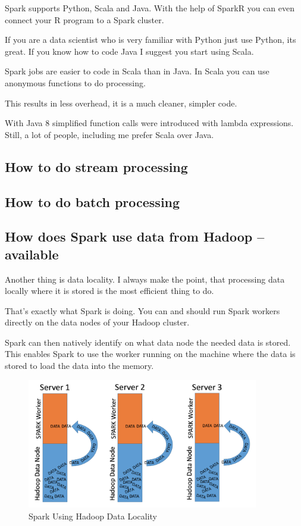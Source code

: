 \documentclass[12pt, numbers=noenddot]{scrreprt} %
\begin{document}
Spark supports Python, Scala and Java. With the help of SparkR you can even connect your R program to a Spark cluster.

If you are a data scientist who is very familiar with Python just use Python, its great. If you know how to code Java I suggest you start using Scala.

Spark jobs are easier to code in Scala than in Java. In Scala you can use anonymous functions to do processing.

This results in less overhead, it is a much cleaner, simpler code.

With Java 8 simplified function calls were introduced with lambda expressions. Still, a lot of people, including me prefer Scala over Java.

\subsection{How to do stream processing}
\subsection{How to do batch processing}
\subsection{How does Spark use data from Hadoop -- available}
Another thing is data locality. I always make the point, that processing data locally where it is stored is the most efficient thing to do.

That’s exactly what Spark is doing. You can and should run Spark workers directly on the data nodes of your Hadoop cluster.

Spark can then natively identify on what data node the needed data is stored. This enables Spark to use the worker running on the machine where the data is stored to load the data into the memory.

\begin{figure}[htbp]
  \centering
     \includegraphics[width=0.9\textwidth]{images/Spark-Data-Locality}
  \caption{Spark Using Hadoop Data Locality}
  \label{fig:Bild1}
\end{figure}
\end{document}
